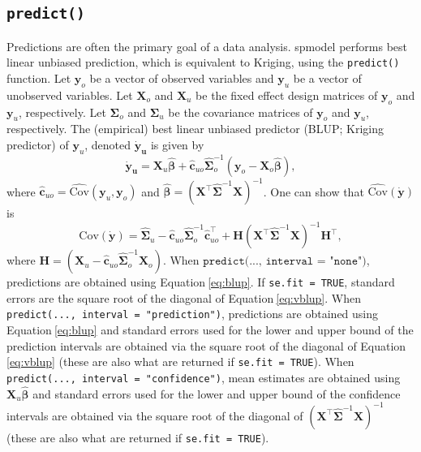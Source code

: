 \documentclass{article}
\begin{document}
\hypertarget{predict}{%
\subsection{\texorpdfstring{\texttt{predict()}}{predict()}}\label{predict}}

Predictions are often the primary goal of a data analysis. spmodel
performs best linear unbiased prediction, which is equivalent to
Kriging, using the \texttt{predict()} function. Let \(\mathbf{y}_o\) be
a vector of observed variables and \(\mathbf{y}_u\) be a vector of
unobserved variables. Let \(\mathbf{X}_o\) and \(\mathbf{X}_u\) be the
fixed effect design matrices of \(\mathbf{y}_o\) and \(\mathbf{y}_u\),
respectively. Let \(\mathbf{\Sigma}_o\) and \(\mathbf{\Sigma}_u\) be the
covariance matrices of \(\mathbf{y}_o\) and \(\mathbf{y}_u\),
respectively. The (empirical) best linear unbiased predictor (BLUP;
Kriging predictor) of \(\mathbf{y}_u\), denoted \(\mathbf{\dot{y}_u}\)
is given by \begin{equation}\label{eq:blup}
  \mathbf{\dot{y}_u} =  \mathbf{X}_u \bm{\hat{\beta}} + \mathbf{\hat{c}}_{uo} \mathbf{\hat{\Sigma}}^{-1}_o (\mathbf{y}_o - \mathbf{X}_o \bm{\hat{\beta}}) ,
\end{equation} where
\(\mathbf{\hat{c}}_{uo} = \hat{\text{Cov}}(\mathbf{y}_u, \mathbf{y}_o)\)
and
\(\bm{\hat{\beta}} = (\mathbf{X}^\intercal \mathbf{\hat{\Sigma}}^{-1} \mathbf{X})^{-1}\).
One can show that \(\hat{\text{Cov}}(\mathbf{\dot{y}})\) is
\begin{equation}\label{eq:vblup}
  \text{Cov}(\mathbf{\dot{y}}) = \mathbf{\hat{\Sigma}}_u - \mathbf{\hat{c}}_{uo} \mathbf{\hat{\Sigma}}^{-1}_o \mathbf{\hat{c}}_{uo}^\intercal + \mathbf{H}(\mathbf{X}^\intercal \mathbf{\hat{\Sigma}}^{-1} \mathbf{X})^{-1}\mathbf{H}^\intercal ,
\end{equation} where
\(\mathbf{H} = (\mathbf{X}_u - \mathbf{\hat{c}}_{uo} \mathbf{\hat{\Sigma}}^{-1}_o \mathbf{X}_o)\).
When \(\texttt{predict(..., interval = "none")}\), predictions are
obtained using Equation\(~\)\ref{eq:blup}. If \texttt{se.fit = TRUE},
standard errors are the square root of the diagonal of
Equation\(~\)\ref{eq:vblup}. When
\texttt{predict(..., interval = "prediction")}, predictions are obtained
using Equation\(~\)\ref{eq:blup} and standard errors used for the lower
and upper bound of the prediction intervals are obtained via the square
root of the diagonal of Equation\(~\)\ref{eq:vblup} (these are also what
are returned if \texttt{se.fit = TRUE}). When
\texttt{predict(..., interval = "confidence")}, mean estimates are
obtained using \(\mathbf{X}_u \bm{\hat{\beta}}\) and standard errors
used for the lower and upper bound of the confidence intervals are
obtained via the square root of the diagonal of
\((\mathbf{X}^\intercal \mathbf{\hat{\Sigma}}^{-1} \mathbf{X})^{-1}\)
(these are also what are returned if \texttt{se.fit = TRUE}).
\end{document}
